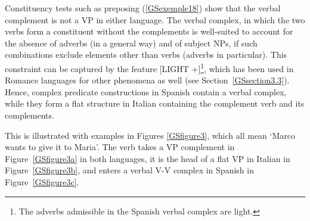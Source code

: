 \documentclass[output=paper
                ,modfonts
                ,nonflat
	        ,collection
	        ,collectionchapter
	        ,collectiontoclongg
 	        ,biblatex
                ,babelshorthands
                ,newtxmath
                ,draftmode
                ,colorlinks, citecolor=brown
]{./langsci/langscibook}
\begin{document}
{\eal
\label{GSexemple23} 
\label{GSexemple23a}

\label{GSexemple23b}	
\zl

Constituency tests such as preposing (\ref{GSexemple18}) show that the verbal complement is not a VP in either language. The verbal complex, in which the two verbs form a constituent without the complements is well-suited to account for the absence of adverbs (in a general way) and of subject NPs, if such combinations exclude elements other than verbs (adverbs in particular). This constraint can be captured by the feature [LIGHT +]\footnote{The adverbs admissible in the Spanish verbal complex are light.}, which has been used in Romance languages for other phenomena as well \citep{abeille2000french} (see Section~\ref{GSsection3.3}). Hence, complex predicate constructions in Spanish contain a verbal complex, while they form a flat structure in Italian containing the complement verb and its complements. 

This is illustrated with examples in Figures \ref{GSfigure3}, which all mean `Marco wants to give it to Maria'. The verb takes a VP complement in Figure~\ref{GSfigure3a} in both languages, it is the head of a flat VP in Italian in Figure~\ref{GSfigure3b}, and enters a verbal V-V complex in Spanish in Figure~\ref{GSfigure3c}.

}
\end{document}
